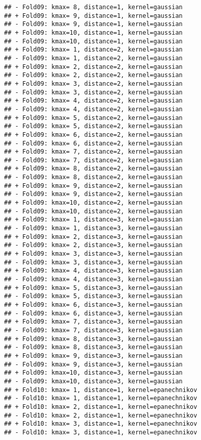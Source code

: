 \documentclass[
]{article}
\begin{document}
\begin{verbatim}
## - Fold09: kmax= 8, distance=1, kernel=gaussian 
## + Fold09: kmax= 9, distance=1, kernel=gaussian 
## - Fold09: kmax= 9, distance=1, kernel=gaussian 
## + Fold09: kmax=10, distance=1, kernel=gaussian 
## - Fold09: kmax=10, distance=1, kernel=gaussian 
## + Fold09: kmax= 1, distance=2, kernel=gaussian 
## - Fold09: kmax= 1, distance=2, kernel=gaussian 
## + Fold09: kmax= 2, distance=2, kernel=gaussian 
## - Fold09: kmax= 2, distance=2, kernel=gaussian 
## + Fold09: kmax= 3, distance=2, kernel=gaussian 
## - Fold09: kmax= 3, distance=2, kernel=gaussian 
## + Fold09: kmax= 4, distance=2, kernel=gaussian 
## - Fold09: kmax= 4, distance=2, kernel=gaussian 
## + Fold09: kmax= 5, distance=2, kernel=gaussian 
## - Fold09: kmax= 5, distance=2, kernel=gaussian 
## + Fold09: kmax= 6, distance=2, kernel=gaussian 
## - Fold09: kmax= 6, distance=2, kernel=gaussian 
## + Fold09: kmax= 7, distance=2, kernel=gaussian 
## - Fold09: kmax= 7, distance=2, kernel=gaussian 
## + Fold09: kmax= 8, distance=2, kernel=gaussian 
## - Fold09: kmax= 8, distance=2, kernel=gaussian 
## + Fold09: kmax= 9, distance=2, kernel=gaussian 
## - Fold09: kmax= 9, distance=2, kernel=gaussian 
## + Fold09: kmax=10, distance=2, kernel=gaussian 
## - Fold09: kmax=10, distance=2, kernel=gaussian 
## + Fold09: kmax= 1, distance=3, kernel=gaussian 
## - Fold09: kmax= 1, distance=3, kernel=gaussian 
## + Fold09: kmax= 2, distance=3, kernel=gaussian 
## - Fold09: kmax= 2, distance=3, kernel=gaussian 
## + Fold09: kmax= 3, distance=3, kernel=gaussian 
## - Fold09: kmax= 3, distance=3, kernel=gaussian 
## + Fold09: kmax= 4, distance=3, kernel=gaussian 
## - Fold09: kmax= 4, distance=3, kernel=gaussian 
## + Fold09: kmax= 5, distance=3, kernel=gaussian 
## - Fold09: kmax= 5, distance=3, kernel=gaussian 
## + Fold09: kmax= 6, distance=3, kernel=gaussian 
## - Fold09: kmax= 6, distance=3, kernel=gaussian 
## + Fold09: kmax= 7, distance=3, kernel=gaussian 
## - Fold09: kmax= 7, distance=3, kernel=gaussian 
## + Fold09: kmax= 8, distance=3, kernel=gaussian 
## - Fold09: kmax= 8, distance=3, kernel=gaussian 
## + Fold09: kmax= 9, distance=3, kernel=gaussian 
## - Fold09: kmax= 9, distance=3, kernel=gaussian 
## + Fold09: kmax=10, distance=3, kernel=gaussian 
## - Fold09: kmax=10, distance=3, kernel=gaussian 
## + Fold10: kmax= 1, distance=1, kernel=epanechnikov 
## - Fold10: kmax= 1, distance=1, kernel=epanechnikov 
## + Fold10: kmax= 2, distance=1, kernel=epanechnikov 
## - Fold10: kmax= 2, distance=1, kernel=epanechnikov 
## + Fold10: kmax= 3, distance=1, kernel=epanechnikov 
## - Fold10: kmax= 3, distance=1, kernel=epanechnikov 

\end{verbatim}
\end{document}
